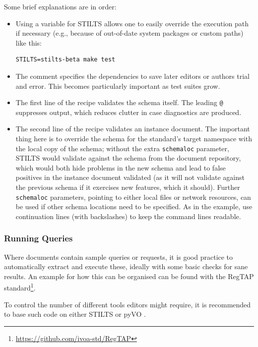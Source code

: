 \documentclass[11pt,a4paper]{ivoa}
\begin{document}
Some brief explanations are in order:

\begin{itemize}
\item Using a variable for STILTS allows one to easily override the
execution path if necessary (e.g., because of out-of-date system
packages or custom paths) like this:

\begin{lstlisting}
STILTS=stilts-beta make test
\end{lstlisting}

\item The comment specifies the dependencies to save later editors or
authors trial and error.  This becomes particularly important as test
suites grow.

\item The first line of the recipe validates the schema itself.  The
leading \verb|@| suppresses output, which reduces clutter in case
diagnostics are produced.

\item The second line of the recipe validates an instance document.  The
important thing here is to override the schema for the standard's target
namespace with the local copy of the schema; without the extra
\verb|schemaloc| parameter, STILTS would validate against the schema
from the document repository, which would both hide problems in the new
schema and lead to false positives in the instance document validated
(as it will not validate against the previous schema if it exercises new
features, which it should).  Further \verb|schemaloc| parameters,
pointing to either local files or network resources,
can be used if other schema locations need to be specified.
As in the example, use continuation lines (with backslashes)
to keep the command lines readable.

\end{itemize}

\subsubsection{Running Queries}

Where documents contain sample queries or requests, it is good practice
to automatically extract and execute these, ideally with some basic
checks for sane results.  An example for how this can be organised can
be found with the RegTAP
standard\footnote{\url{https://github.com/ivoa-std/RegTAP}}.

To control the number of different tools editors might require, it
is recommended to base such code on either STILTS or pyVO
\citep{2014ascl.soft02004G}.
\end{document}

